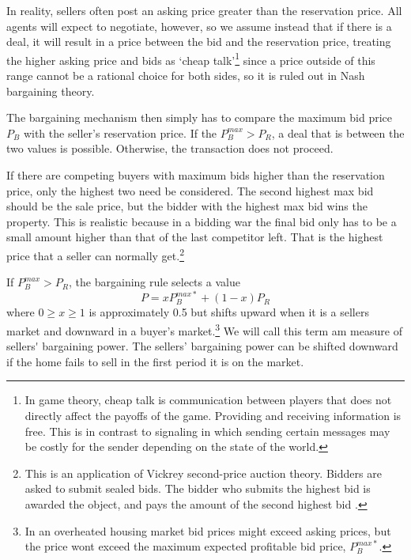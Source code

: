 In reality, sellers often post an asking price greater than the reservation price. All agents will expect to negotiate, however, so we assume instead that if there is a deal, it will result in a price between the bid and the reservation price, treating the higher asking price and bids as `cheap talk'\footnote{In game theory, cheap talk is communication between players that does not directly affect the payoffs of the game. Providing and receiving information is free. This is in contrast to signaling in which sending certain messages may be costly for the sender depending on the state of the world.} since a price outside of this range cannot be a rational choice for both sides, so it is ruled out in Nash bargaining theory.

The bargaining  mechanism then simply has to compare the maximum bid price $P_B$ with the seller's reservation price. If the $P_B^{max}>P_R$, a deal that is between the two values is possible. Otherwise, the transaction does not proceed.

If there are competing buyers with maximum bids higher than the reservation price, only the highest two need be considered. The second highest max bid should be the sale price, but the bidder with the highest max bid wins the property. This is realistic because in a bidding war the final bid only has to be a small amount higher than that of the last competitor left. That is the highest price that a seller can normally get.\footnote{This is an application of Vickrey \gls{second-price auction} theory. Bidders are asked to submit sealed bids. %
The bidder who submits the highest bid is awarded the object, and pays the amount of the second highest bid \cite{levinAuctionTheory2004}.}

If $P_B^{max}>P_R$,  the bargaining rule selects a value 
\[P = xP_B^{max*}+(1-x)P_R\]
where $0\ge x\ge 1$ is approximately 0.5 but shifts upward when it is a sellers market and downward in a buyer's market.\footnote{In an overheated housing market bid prices might exceed asking prices, but the price wont exceed the maximum expected profitable bid price, $P_B^{max*}$.} We will call this term am measure of \gls{sellers' bargaining power}.  The sellers' bargaining power can be shifted downward if the home fails to sell in the first period it is on the market. 




